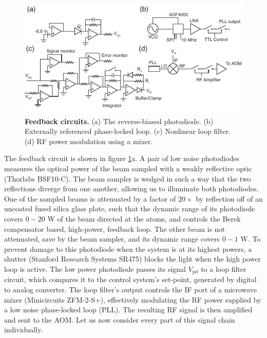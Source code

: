 \documentclass[twocolumn,aps,pra,showpacs,preprintnumbers,bibnotes]{revtex4-1}
\begin{document}
\begin{figure}
  \begin{center}
    \includegraphics{fig/circuits.pdf}
    \caption{\textbf{Feedback circuits.} (a) The reverse-biased photodiode. (b) Externally referenced phase-locked loop. (c) Nonlinear loop filter. (d) RF power modulation using a mixer.}\label{fig:circuits}
  \end{center}
\end{figure}
The feedback circuit is shown in figure \ref{fig:circuits}a. A pair of low noise photodiodes measures the optical power of the beam sampled with a weakly reflective optic (Thorlabs BSF10-C). 
The beam sampler is wedged in such a way that the two reflections diverge from one another, allowing us to illuminate both photodiodes. 
One of the sampled beams is attenuated by a factor of $20\times$ by reflection off of an uncoated fused silica glass plate, such that the dynamic range of its photodiode covers $0-20$ W of the beam directed at the atoms, and controls the Berek compensator based, high-power, feedback loop. 
The other beam is not attenuated, save by the beam sampler, and its dynamic range covers $0-1$ W.
To prevent damage to this photodiode when the system is at its highest powers, a shutter (Stanford Research Systems SR475) blocks the light when the high power loop is active.
The low power photodiode passes its signal $V_{\mathrm{pd}}$ to a loop filter circuit, which compares it to the control system's set-point, generated by digital to analog converter.
The loop filter's output controls the IF port of a microwave mixer (Minicircuits ZFM-2-S+), effectively modulating the RF power supplied by a low noise phase-locked loop (PLL).
The resulting RF signal is then amplified and sent to the AOM.
Let us now consider every part of this signal chain individually.
\end{document}
